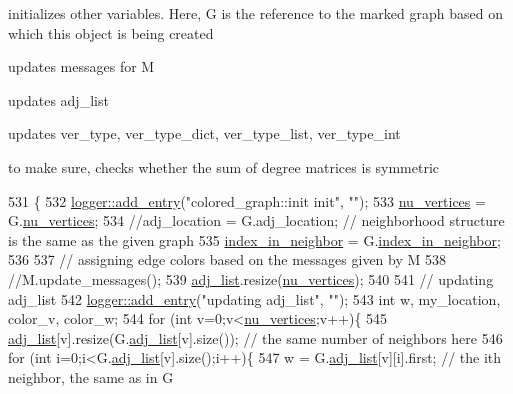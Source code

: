 initializes other variables. Here, G is the reference to the marked graph based on which this object is being created 


\begin{DoxyItemize}
\item updates messages for M
\item updates adj\+\_\+list
\item updates ver\+\_\+type, ver\+\_\+type\+\_\+dict, ver\+\_\+type\+\_\+list, ver\+\_\+type\+\_\+int
\item to make sure, checks whether the sum of degree matrices is symmetric 
\end{DoxyItemize}
\begin{DoxyCode}
531 \{
532   \hyperlink{classlogger_a710163deb17bc81f70d53d285b8ac9ac}{logger::add\_entry}(\textcolor{stringliteral}{"colored\_graph::init init"}, \textcolor{stringliteral}{""});
533   \hyperlink{classcolored__graph_a90ece8eb1fec52f3f41549ab527c1d5b}{nu\_vertices} = G.\hyperlink{classmarked__graph_acf79c6aeb8f32614cb14a5baaa6c9f9b}{nu\_vertices};
534   \textcolor{comment}{//adj\_location = G.adj\_location; // neighborhood structure is the same as the given graph}
535   \hyperlink{classcolored__graph_ae28fcd089f9785204d76b6a608bed54f}{index\_in\_neighbor} = G.\hyperlink{classmarked__graph_aee10b537408de42476609c1e45c075d0}{index\_in\_neighbor};
536 
537   \textcolor{comment}{// assigning edge colors based on the messages given by M}
538   \textcolor{comment}{//M.update\_messages();}
539   \hyperlink{classcolored__graph_a45dce16965079286cf3f41a54a1b2ea4}{adj\_list}.resize(\hyperlink{classcolored__graph_a90ece8eb1fec52f3f41549ab527c1d5b}{nu\_vertices});
540 
541   \textcolor{comment}{// updating adj\_list}
542   \hyperlink{classlogger_a710163deb17bc81f70d53d285b8ac9ac}{logger::add\_entry}(\textcolor{stringliteral}{"updating adj\_list"}, \textcolor{stringliteral}{""});
543   \textcolor{keywordtype}{int} w, my\_location, color\_v, color\_w;
544   \textcolor{keywordflow}{for} (\textcolor{keywordtype}{int} v=0;v<\hyperlink{classcolored__graph_a90ece8eb1fec52f3f41549ab527c1d5b}{nu\_vertices};v++)\{
545     \hyperlink{classcolored__graph_a45dce16965079286cf3f41a54a1b2ea4}{adj\_list}[v].resize(G.\hyperlink{classmarked__graph_a1a0bf7ca413a278763f7c878b3b6fd6f}{adj\_list}[v].size()); \textcolor{comment}{// the same number of neighbors here}
546     \textcolor{keywordflow}{for} (\textcolor{keywordtype}{int} i=0;i<G.\hyperlink{classmarked__graph_a1a0bf7ca413a278763f7c878b3b6fd6f}{adj\_list}[v].size();i++)\{
547       w = G.\hyperlink{classmarked__graph_a1a0bf7ca413a278763f7c878b3b6fd6f}{adj\_list}[v][i].first; \textcolor{comment}{// the ith neighbor, the same as in G}

\end{DoxyCode}
